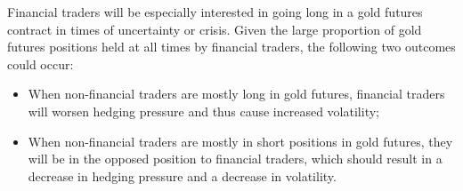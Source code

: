 \documentclass[12pt]{article}
\begin{document}
Financial traders will be especially interested in going long in a gold futures contract in times of uncertainty or crisis. Given the large proportion of gold futures positions held at all times by financial traders, the following two outcomes could occur:

\begin{itemize}
\item When non-financial traders are mostly long in  gold futures, financial traders will worsen  hedging pressure  and thus cause increased volatility;
\item When non-financial traders are mostly in short positions in gold futures, they will be in the opposed position to financial traders, which should result in a decrease in hedging pressure and a decrease in volatility.
\end{itemize}
\end{document}
